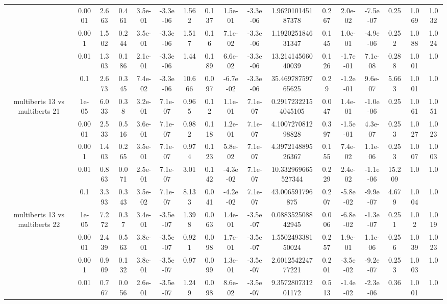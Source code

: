\begin{tabular}{|c|c|c|c|c|c|c|c|c|c|c|c|c|c|c|c|c|}
 & 0.0001 & 2.663 & 0.461 & 3.5e-01 & -3.3e-06 & 1.562 & 0.137 & 1.5e-01 & -3.3e-06 & 1.962010145187378 & 0.267 & 2.0e-02 & -7.5e-07 & 0.25 & 1.069 & 1.032 \\
 & 0.001 & 1.502 & 0.244 & 3.5e-01 & -3.3e-06 & 1.517 & 0.16 & 7.1e-02 & -3.3e-06 & 1.192025184631347 & 0.145 & 1.0e-01 & -4.9e-06 & 0.252 & 1.088 & 1.024 \\
 & 0.01 & 1.303 & 0.186 & 2.1e-01 & -3.3e-06 & 1.44 & 0.189 & 6.6e-02 & -3.3e-06 & 13.21414566040039 & 0.126 & -1.7e-01 & 7.1e-08 & 0.288 & 1.001 & 1.0 \\
 & 0.1 & 2.673 & 0.345 & 7.4e-02 & -3.3e-06 & 10.666 & 0.097 & -6.7e-02 & -3.3e-06 & 35.46978759765625 & 0.29 & -1.2e-01 & 9.6e-07 & 5.663 & 1.001 & 1.0 \\
\hline
\multirow{5}{*}{multiberts 13 vs multiberts 21} & 1e-05 & 6.033 & 0.38 & 3.2e-01 & 7.1e-07 & 0.965 & 0.12 & 1.1e-01 & 7.1e-07 & 0.29172322154045105 & 0.047 & 1.4e-01 & -1.0e-06 & 0.25 & 1.061 & 1.051 \\
 & 0.0001 & 2.533 & 0.516 & 3.6e-01 & 7.1e-07 & 0.982 & 0.118 & 1.2e-01 & 7.1e-07 & 4.100727081298828 & 0.397 & -1.5e-01 & 4.3e-07 & 0.253 & 1.027 & 1.023 \\
 & 0.001 & 1.403 & 0.265 & 3.5e-01 & 7.1e-07 & 0.974 & 0.123 & 5.8e-02 & 7.1e-07 & 4.397214889526367 & 0.155 & 7.4e-02 & 1.1e-06 & 0.253 & 1.007 & 1.003 \\
 & 0.01 & 0.863 & 0.071 & 2.5e-01 & 7.1e-07 & 3.01 & 0.142 & -4.3e-02 & 7.1e-07 & 10.332969665527344 & 0.229 & 2.4e-02 & -1.1e-06 & 15.209 & 1.0 & 1.0 \\
 & 0.1 & 3.393 & 0.343 & 3.5e-02 & 7.1e-07 & 8.133 & 0.041 & -4.2e-02 & 7.1e-07 & 43.006591796875 & 0.207 & -5.8e-02 & -9.9e-07 & 4.679 & 1.004 & 1.0 \\
\hline
\multirow{5}{*}{multiberts 13 vs multiberts 22} & 1e-05 & 7.272 & 0.37 & 3.4e-01 & -3.5e-07 & 1.398 & 0.063 & 1.4e-01 & -3.5e-07 & 0.088352508842945 & 0.006 & -6.8e-02 & -1.3e-07 & 0.251 & 1.02 & 1.019 \\
 & 0.0001 & 2.439 & 0.563 & 3.8e-01 & -3.5e-07 & 0.921 & 0.098 & 1.7e-01 & -3.5e-07 & 1.550249338150024 & 0.257 & 1.9e-01 & 1.1e-06 & 0.256 & 1.039 & 1.023 \\
 & 0.001 & 0.909 & 0.132 & 3.8e-01 & -3.5e-07 & 0.97 & 0.099 & 1.3e-01 & -3.5e-07 & 2.601254224777221 & 0.201 & -3.5e-02 & -9.2e-07 & 0.253 & 1.003 & 1.0 \\
 & 0.01 & 0.767 & 0.056 & 2.6e-01 & -3.5e-07 & 1.249 & 0.098 & 8.6e-02 & -3.5e-07 & 9.357280731201172 & 0.513 & -1.4e-02 & -2.3e-06 & 0.36 & 1.001 & 1.0 \\

\end{tabular}
